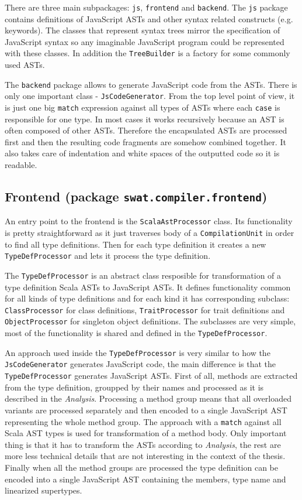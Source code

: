 \documentclass[12pt,a4paper]{report}
\begin{document}
There are three main subpackages: \texttt{js}, \texttt{frontend} and \texttt{backend}. The \texttt{js} package contains definitions of JavaScript ASTs and other syntax related constructs (e.g. keywords). The classes that represent syntax trees mirror the specification of JavaScript syntax \cite{EcmaScript} so any imaginable JavaScript program could be represented with these classes. In addition the \texttt{TreeBuilder} is a factory for some commonly used ASTs.

The \texttt{backend} package allows to generate JavaScript code from the ASTs. There is only one important class - \texttt{JsCodeGenerator}. From the top level point of view, it is just one big \texttt{match} expression against all types of ASTs where each \texttt{case} is responsible for one type. In most cases it works recursively because an AST is often composed of other ASTs. Therefore the encapsulated ASTs are processed first and then the resulting code fragments are somehow combined together. It also takes care of indentation and white spaces of the outputted code so it is readable.

\subsection{Frontend (package \texttt{swat.compiler.frontend})}

An entry point to the frontend is the \texttt{ScalaAstProcessor} class. Its functionality is pretty straightforward as it just traverses body of a \texttt{CompilationUnit} in order to find all type definitions. Then for each type definition it creates a new \texttt{TypeDefProcessor} and lets it process the type definition.

The \texttt{TypeDefProcessor} is an abstract class resposible for transformation of a type definition Scala ASTs to JavaScript ASTs. It defines functionality common for all kinds of type definitions and for each kind it has corresponding subclass: \texttt{ClassProcessor} for class definitions, \texttt{TraitProcessor} for trait definitions and \texttt{ObjectProcessor} for singleton object definitions. The subclasses are very simple, most of the functionality is shared and defined in the \texttt{TypeDefProcessor}.

An approach used inside the \texttt{TypeDefProcessor} is very similar to how the \texttt{JsCodeGenerator} generates JavaScript code, the main difference is that the \texttt{TypeDefProcessor} generates JavaScript ASTs. First of all, methods are extracted from the type definition, groupped by their names and processed as it is described in the {\it Analysis}. Processing a method group means that all overloaded variants are processed separately and then encoded to a single JavaScript AST representing the whole method group. The approach with a \texttt{match} against all Scala AST types is used for transformation of a method body. Only important thing is that it has to transform the ASTs according to {\it Analysis}, the rest are more less technical details that are not interesting in the context of the thesis. Finally when all the method groups are processed the type definition can be encoded into a single JavaScript AST containing the members, type name and linearized supertypes.
\end{document}
